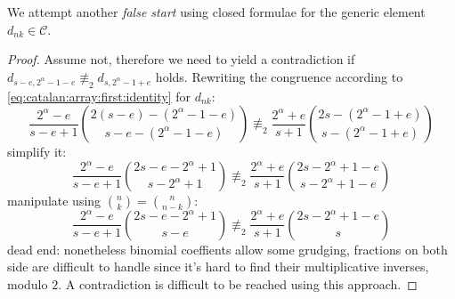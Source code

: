 We attempt another \emph{false start} using closed formulae for
the generic element $d_{nk}\in\mathcal{C}$.
\begin{proof}
Assume not, therefore we need to yield a contradiction if
    $d_{s-e,2^{{\alpha}}-1-e} \not\equiv_{2} d_{s,2^{{\alpha}}-1+e}$
holds. Rewriting the congruence according to \autoref{eq:catalan:array:first:identity}
 for $d_{nk}$:
\begin{displaymath}
    \frac{2^{{\alpha}}-e}{s-e+1}{{2(s-e)-(2^{{\alpha}}-1-e)}\choose{s-e-(2^{{\alpha}}-1-e)}}
    \not\equiv_{2}
    \frac{2^{{\alpha}}+e}{s+1}{{2s-(2^{{\alpha}}-1+e)}\choose{s-(2^{{\alpha}}-1+e)}}
\end{displaymath}
simplify it:
\begin{displaymath}
    \frac{2^{{\alpha}}-e}{s-e+1}{{2s-e-2^{{\alpha}}+1}\choose{s-2^{{\alpha}}+1}}
    \not\equiv_{2}
    \frac{2^{{\alpha}}+e}{s+1}{{2s-2^{{\alpha}}+1-e}\choose{s-2^{{\alpha}}+1-e}}
\end{displaymath}
manipulate using ${{n}\choose{k}}={{n}\choose{n-k}}$:
\begin{displaymath}
    \frac{2^{{\alpha}}-e}{s-e+1}{{2s-e-2^{{\alpha}}+1}\choose{s-e}}
    \not\equiv_{2}
    \frac{2^{{\alpha}}+e}{s+1}{{2s-2^{{\alpha}}+1-e}\choose{s}}
\end{displaymath}
dead end: nonetheless binomial coeffients allow some grudging,
fractions on both side are difficult to handle since it's hard
to find their multiplicative inverses, modulo $2$. A contradiction
is difficult to be reached using this approach.
\end{proof} 

